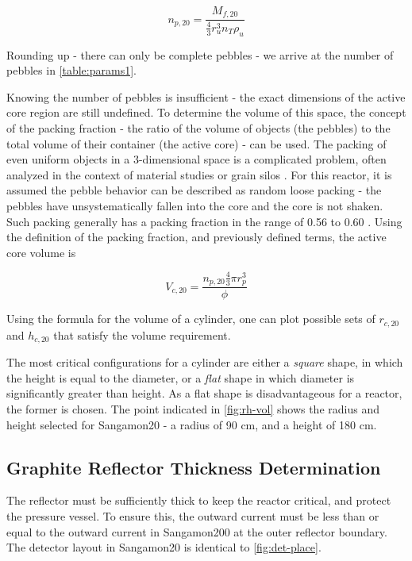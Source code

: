 \begin{equation}
n_{p,20} = \frac{M_{f,20}}{\frac{4}{3}r_{u}^3n_{T}\rho_{u}}
\end{equation}

Rounding up - there can only be complete pebbles - we arrive at the number of pebbles in \ref{table:params1}.

Knowing the number of pebbles is insufficient - the exact dimensions of the active core region are still undefined.  To determine the volume of this space, the concept of the packing fraction - the ratio of the volume of objects (the pebbles) to the total volume of their container (the active core) - can be used.  The packing of even uniform objects in a 3-dimensional space is a complicated problem, often analyzed in the context of material studies or grain silos \cite{tulluri_analysis_nodate}.  For this reactor, it is assumed the pebble behavior can be described as random loose packing \cite{tulluri_analysis_nodate} - the pebbles have unsystematically fallen into the core and the core is not shaken.  Such packing generally has a packing fraction in the range of 0.56 to 0.60 \cite{tulluri_analysis_nodate}.  Using the definition of the packing fraction, and previously defined terms, the active core volume is

\begin{equation}
V_{c,20} = \frac{ n_{p,20}\frac{4}{3}\pi r_{p}^3 }{ \phi }
\end{equation}

Using the formula for the volume of a cylinder, one can plot possible sets of $r_{c,20}$ and $h_{c,20}$ that satisfy the volume requirement.



The most critical configurations for a cylinder are either a \emph{square} shape, in which the height is equal to the diameter, or a \emph{flat} shape in which diameter is significantly greater than height.  As a flat shape is disadvantageous for a reactor, the former is chosen.  The point indicated in \ref{fig:rh-vol} shows the radius and height selected for Sangamon20 - a radius of 90 cm, and a height of 180 cm.

\subsection{Graphite Reflector Thickness Determination}

The reflector must be sufficiently thick to keep the reactor critical, and protect the pressure vessel.  To ensure this, the outward current must be less than or equal to the outward current in Sangamon200 at the outer reflector boundary.  The detector layout in Sangamon20 is identical to \ref{fig:det-place}.


